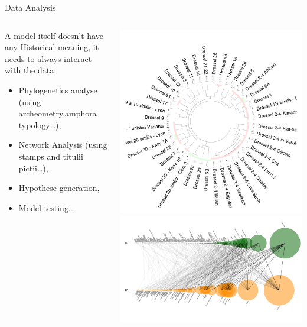\documentclass[8pt, handout=show,notes=show]{beamer}
\begin{document}
\begin{frame}{Data Analysis}
    \begin{columns}
	\begin{column}{.6\textwidth}
    	A model itself doesn't have any Historical meaning, it needs to always interact with the data:  
	    \begin{itemize}
		\item Phylogenetics analyse (using archeometry,amphora typology\ldots),
		\item Network Analysis (using stamps and titulii pictii\ldots),
		\item Hypothese generation,
		\item Model testing\ldots
	    \end{itemize}
	\end{column}
	\begin{column}{.4\textwidth}
	    \includegraphics[width=\textwidth]{images/dressel-all.png}\\
	    \includegraphics[width=\textwidth]{images/networkBicouche.pdf}
	    

\end{column}
\end{columns}
\end{frame}
\end{document}
